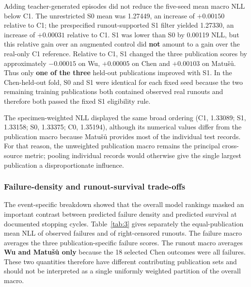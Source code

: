\documentclass[12pt,a4paper]{article}
\begin{document}
Adding teacher-generated episodes did not reduce the five-seed mean macro NLL below C1. The unrestricted S0 mean was 1.27449, an increase of \(+0.00150\) relative to C1; the prespecified runout-supported S1 filter yielded 1.27330, an increase of \(+0.00031\) relative to C1. S1 was lower than S0 by 0.00119 NLL, but this relative gain over an augmented control did \textbf{not} amount to a gain over the real-only C1 reference. Relative to C1, S1 changed the three publication scores by approximately \(-0.00015\) on Wu, \(+0.00005\) on Chen and \(+0.00103\) on Matušů. Thus only \textbf{one of the three} held-out publications improved with S1. In the Chen-held-out fold, S0 and S1 were identical for each fixed seed because the two remaining training publications both contained observed real runouts and therefore both passed the fixed S1 eligibility rule.

The specimen-weighted NLL displayed the same broad ordering (C1, 1.33089; S1, 1.33158; S0, 1.33375; C0, 1.35194), although its numerical values differ from the publication macro because Matušů provides most of the individual test records. For that reason, the unweighted publication macro remains the principal cross-source metric; pooling individual records would otherwise give the single largest publication a disproportionate influence.

\subsubsection{Failure-density and runout-survival trade-offs}

The event-specific breakdown showed that the overall model rankings masked an important contrast between predicted failure density and predicted survival at documented stopping cycles. Table~\ref{tab:3} gives separately the equal-publication mean NLL of observed failures and of right-censored runouts. The failure macro averages the three publication-specific failure scores. The runout macro averages \textbf{Wu and Matušů only} because the 18 selected Chen outcomes were all failures. These two quantities therefore have different contributing publication sets and should not be interpreted as a single uniformly weighted partition of the overall macro.
\end{document}
